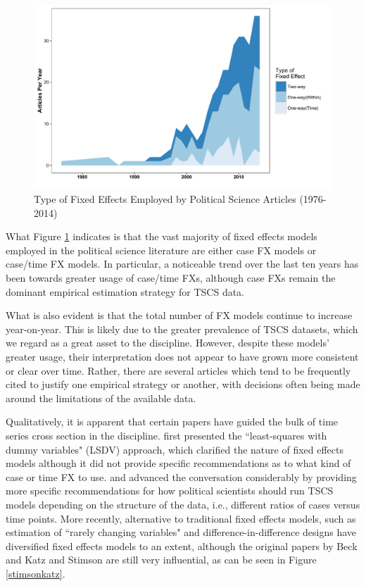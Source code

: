\documentclass{article}[12pt]
\begin{document}
\begin{figure}
	\centering
	\includegraphics[width=\linewidth]{all_articles}
	\caption{Type of Fixed Effects Employed by Political Science Articles (1976-2014)}\label{allarticles}
\end{figure}

What Figure \ref{allarticles} indicates is that the vast majority of fixed effects models employed in the political science literature are either case FX models or case/time FX models. In particular, a noticeable trend over the last ten years has been towards greater usage of case/time FXs, although case FXs remain the dominant empirical estimation strategy for TSCS data.

What is also evident is that the total number of FX models continue to increase year-on-year. This is likely due to the greater prevalence of TSCS datasets, which we regard as a great asset to the discipline. However, despite these models' greater usage, their interpretation does not appear to have grown more consistent or clear over time. Rather, there are several articles which tend to be frequently cited to justify one empirical strategy or another, with decisions often being made around the limitations of the available data.

Qualitatively, it is apparent that certain papers have guided the bulk of time series cross section in the discipline. \textcite{stimson1985} first presented the ``least-squares with dummy variables" (LSDV) approach, which clarified the nature of fixed effects models although it did not provide specific recommendations as to what kind of case or time FX to use. \textcite{beckkatzturner1998} and \textcite{beckkatz1995} advanced the conversation considerably by providing more specific recommendations for how political scientists should run TSCS models depending on the structure of the data, i.e., different ratios of cases versus time points. More recently, alternative to traditional fixed effects models, such as estimation of ``rarely changing variables" \parencite{plumper2007} and difference-in-difference designs \parencite{abadie2005} have diversified fixed effects models to an extent, although the original papers by Beck and Katz and Stimson are still very influential, as can be seen in Figure \ref{stimsonkatz}.
\end{document}
